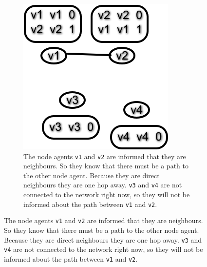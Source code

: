 \begin{figure}
\begin{subfigure}{.45\textwidth}
        \includegraphics[width=\textwidth] {images/dv1.png}
        \caption{The node agents \texttt{v1} and \texttt{v2} are informed that they are neighbours.
                 So they know that there must be a path to the other node agent.
                 Because they are direct neighbours they are one hop away. \texttt{v3} and \texttt{v4} are not connected to the network right now, so they will not be informed about the path between \texttt{v1} and \texttt{v2}.}
    \end{subfigure}


\end{figure}
